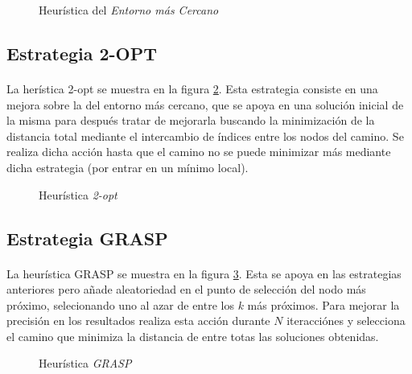 \documentclass[spanish]{article}
\begin{document}
			\begin{figure}
	      \centering
	      \caption{Heurística del \emph{Entorno más Cercano}}
	      \label{code:tsp-greedy}
	    \end{figure}

		\subsection{Estrategia 2-OPT}

			\paragraph{}
			La herística 2-opt se muestra en la figura \ref{code:tsp-2-opt}. Esta estrategia consiste en una mejora sobre la del entorno más cercano, que se apoya en una solución inicial de la misma para después tratar de mejorarla buscando la minimización de la distancia total mediante el intercambio de índices entre los nodos del camino. Se realiza dicha acción hasta que el camino no se puede minimizar más mediante dicha estrategia (por entrar en un mínimo local).

			\begin{figure}
	      \centering
	      \caption{Heurística \emph{2-opt}}
	      \label{code:tsp-2-opt}
	    \end{figure}

		\subsection{Estrategia GRASP}

			\paragraph{}
			La heurística GRASP se muestra en la figura \ref{code:tsp-grasp}. Esta se apoya en las estrategias anteriores pero añade aleatoriedad en el punto de selección del nodo más próximo, selecionando uno al azar de entre los $k$ más próximos. Para mejorar la precisión en los resultados realiza esta acción durante $N$ iteracciónes y selecciona el camino que minimiza la distancia de entre totas las soluciones obtenidas.

			\begin{figure}
				\centering
				\caption{Heurística \emph{GRASP}}
				\label{code:tsp-grasp}
			\end{figure}
\end{document}
